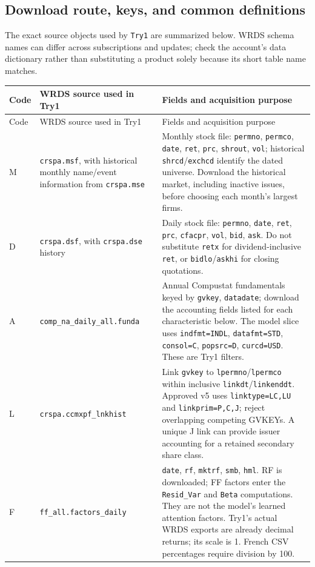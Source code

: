 \documentclass[11pt]{article}
\begin{document}
\subsection{Download route, keys, and common definitions}
The exact source objects used by \texttt{Try1} are summarized below. WRDS schema names can differ across subscriptions and updates; check the account's data dictionary rather than substituting a product solely because its short table name matches.

\begin{longtable}{@{}p{}p{}p{}@{}}
\toprule
Code & WRDS source used in Try1 & Fields and acquisition purpose \\
\midrule
\endfirsthead
\toprule Code & WRDS source used in Try1 & Fields and acquisition purpose \\
\midrule
\endhead
M & \texttt{crspa.msf}, with historical monthly name/event information from \texttt{crspa.mse} & Monthly stock file: \texttt{permno}, \texttt{permco}, \texttt{date}, \texttt{ret}, \texttt{prc}, \texttt{shrout}, \texttt{vol}; historical \texttt{shrcd}/\texttt{exchcd} identify the dated universe. Download the historical market, including inactive issues, before choosing each month's largest firms. \\
\addlinespace
D & \texttt{crspa.dsf}, with \texttt{crspa.dse} history & Daily stock file: \texttt{permno}, \texttt{date}, \texttt{ret}, \texttt{prc}, \texttt{cfacpr}, \texttt{vol}, \texttt{bid}, \texttt{ask}. Do not substitute \texttt{retx} for dividend-inclusive \texttt{ret}, or \texttt{bidlo}/\texttt{askhi} for closing quotations. \\
\addlinespace
A & \texttt{comp\_na\_daily\_all.funda} & Annual Compustat fundamentals keyed by \texttt{gvkey}, \texttt{datadate}; download the accounting fields listed for each characteristic below. The model slice uses \texttt{indfmt=INDL}, \texttt{datafmt=STD}, \texttt{consol=C}, \texttt{popsrc=D}, \texttt{curcd=USD}. These are Try1 filters. \\
\addlinespace
L & \texttt{crspa.ccmxpf\_lnkhist} & Link \texttt{gvkey} to \texttt{lpermno}/\texttt{lpermco} within inclusive \texttt{linkdt}/\texttt{linkenddt}. Approved v5 uses \texttt{linktype=LC,LU} and \texttt{linkprim=P,C,J}; reject overlapping competing GVKEYs. A unique J link can provide issuer accounting for a retained secondary share class. \\
\addlinespace
F & \texttt{ff\_all.factors\_daily} & \texttt{date}, \texttt{rf}, \texttt{mktrf}, \texttt{smb}, \texttt{hml}. RF is downloaded; FF factors enter the \texttt{Resid\_Var} and \texttt{Beta} computations. They are not the model's learned attention factors. Try1's actual WRDS exports are already decimal returns; its scale is 1. French CSV percentages require division by 100. \\
\bottomrule
\end{longtable}
\end{document}
